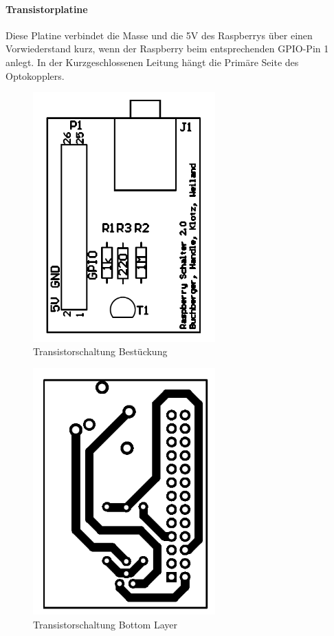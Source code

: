 \paragraph{Transistorplatine}
Diese Platine verbindet die Masse und die 5V des Raspberrys über einen Vorwiederstand kurz, wenn der Raspberry beim entsprechenden GPIO-Pin 1 anlegt. In der Kurzgeschlossenen Leitung hängt die Primäre Seite des Optokopplers.\\
\begin{figure}[H]
\centering
\includegraphics[keepaspectratio=true, width=7cm]{images/rpi/Transistorschaltung_Bestueckung.png}
\caption{Transistorschaltung Bestückung}
\label{fig:report_hardware_TransBest}
\end{figure}
\begin{figure}[H]
\centering
\includegraphics[keepaspectratio=true, width=7cm]{images/rpi/Transistorschaltung_BottomLayer.png}
\caption{Transistorschaltung Bottom Layer}
\label{fig:report_hardware_TransBL}
\end{figure}
